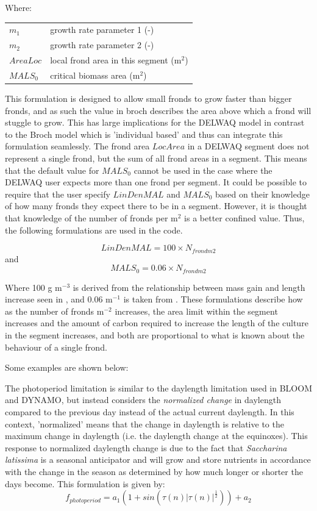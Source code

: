 \documentclass{deltares_manual}
\begin{document}
Where:\\

\begin{tabular}{ll}
	$m_1$    & growth rate parameter 1 (-)\\
	$m_2$    & growth rate parameter 2 (-)\\
	$AreaLoc$ & local frond area in this segment (m$^2$)\\
	$MALS_0$ & critical biomass area (m$^2$)\\
\end{tabular}

This formulation is designed to allow small fronds to grow faster than bigger fronds, and as such the value in broch describes the area above which a frond will stuggle to grow. This has large implications for the DELWAQ model in contrast to the Broch model which is 'individual based' and thus can integrate this formulation seamlessly. The frond area $LocArea$ in a DELWAQ segment does not represent a single frond, but the sum of all frond areas in a segment. This means that the default value for $MALS_{0}$ cannot be used in the case where the DELWAQ user expects more than one frond per segment. It could be possible to require that the user specify $LinDenMAL$ and $MALS_{0}$ based on their knowledge of how many fronds they expect there to be in a segment. However, it is thought that knowledge of the number of fronds per m$^{2}$ is a better confined value. Thus, the following formulations are used in the code.
 
\begin{equation}
LinDenMAL = 100 \times N_{frondm2}
\end{equation}
and
\begin{equation}
MALS_0 = 0.06 \times N_{frondm2}
\end{equation}

Where 100 g m$^{-3}$ is derived from the relationship between mass gain and length increase seen in \cite{sjotun1993}, and 0.06 m$^{-1}$ is taken from \cite{broch2012}. These formulations describe how as the number of fronds m$^{-2}$ increases, the area limit within the segment increases and the amount of carbon required to increase the length of the culture in the segment increases, and both are proportional to what is known about the behaviour of a single frond.

Some examples are shown below:


The photoperiod limitation is similar to the daylength limitation used in BLOOM and DYNAMO, but instead considers the \textit{normalized change} in daylength compared to the previous day instead of the actual current daylength. In this context, 'normalized' means that the change in daylength is relative to the maximum change in daylength (i.e. the daylength change at the equinoxes). This response to normalized daylength change is due to the fact that \textit{Saccharina latissima} is a seasonal anticipator and will grow and store nutrients in accordance with the change in the season as determined by how much longer or shorter the days become. This formulation is given by: 
\begin{equation}
f_{photoperiod} = a_1 (1+sin(\tau (n) | \tau (n)| ^{\frac{1}{2}})) + a_2
\end{equation}
\end{document}

